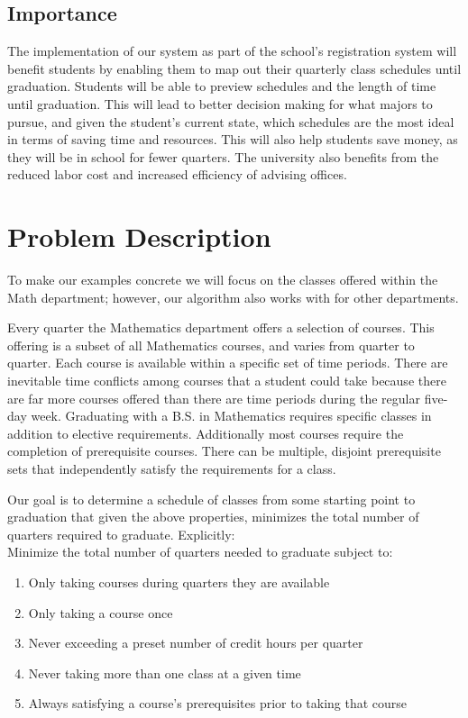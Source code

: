 \documentclass[11pt]{article} %
\begin{document}
\subsection{Importance} The implementation of our system as part of the school’s
registration system will benefit students by enabling them to map out their
quarterly class schedules until graduation.  Students will be able to preview
schedules and the length of time until graduation.  This will lead to better
decision making for what majors to pursue, and given the student's current
state, which schedules are the most ideal in terms of saving time and resources.
This will also help students save money, as they will be in school for fewer
quarters.  The university also benefits from the reduced labor cost and increased
efficiency of advising offices.

\section{Problem Description} \label{pdesc} To make our examples concrete we will focus on the
classes offered within the Math department; however, our algorithm also works with for other departments.

Every quarter the Mathematics department offers a selection of courses.  This offering is a
subset of all Mathematics courses, and varies from quarter to quarter.
Each course is available within a specific set of
time periods.  There are inevitable time conflicts among courses that a student
could take because there are far more courses offered than there are time periods during
the regular five-day week.  Graduating with a B.S. in Mathematics requires
specific classes in addition to elective requirements.
Additionally most courses require the completion of prerequisite courses.
There can be multiple, disjoint prerequisite sets that independently
satisfy the requirements for a class.

Our goal is to determine a schedule of classes from some starting point to
graduation that given the above properties, minimizes the total number of
quarters required to graduate.  Explicitly: \\ Minimize the total
number of quarters needed to graduate subject to: \begin{enumerate} \item Only
taking courses during quarters they are available \item Only taking a course
once \item Never exceeding a preset number of credit hours per quarter \item
Never taking more than one class at a given time \item Always satisfying
a course's prerequisites prior to taking that course \end{enumerate}
\end{document}
